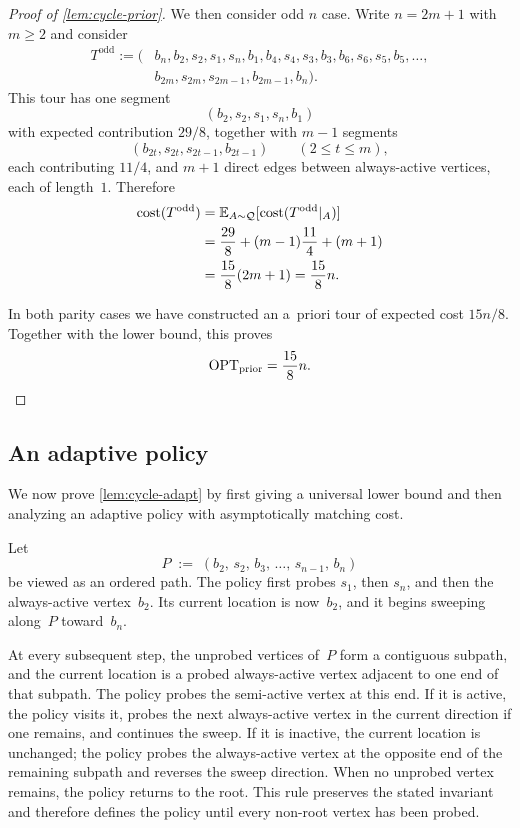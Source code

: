 \documentclass[12pt,a4paper,oneside]{report}
\begin{document}
\begin{proof}[Proof of \cref{lem:cycle-prior}]
\medskip
We then consider odd $n$ case.
Write $n=2m+1$ with $m\ge2$ and consider
\begin{align*}
T^{\mathrm{odd}}
:=(&b_n,b_2,s_2,s_1,s_n,b_1,
   b_4,s_4,s_3,b_3,
   b_6,s_6,s_5,b_5,
   \dots,\\
  &b_{2m},s_{2m},s_{2m-1},b_{2m-1},b_n).
\end{align*}
This tour has one segment
\[
    (b_2,s_2,s_1,s_n,b_1)
\]
with expected contribution $29/8$, together with $m-1$ segments
\[
    (b_{2t},s_{2t},s_{2t-1},b_{2t-1})
    \qquad(2\le t\le m),
\]
each contributing $11/4$, and $m+1$ direct edges between always-active vertices,
each of length~$1$.  Therefore
\begin{align*}
    \operatorname{cost}(T^{\mathrm{odd}})
    &=\mathbb{E}_{A\sim\mathcal Q}[\operatorname{cost}(T^{\mathrm{odd}}|_A)]\\
    &=
    \frac{29}{8}
    +(m-1)\frac{11}{4}
    +(m+1)\\
    &=
    \frac{15}{8}(2m+1)
    =
    \frac{15}{8}n.
\end{align*}

In both parity cases we have constructed an a~priori tour of expected cost
$15n/8$.  Together with the lower bound, this proves
\[
    \operatorname{OPT}_\mathrm{prior}=\frac{15}{8}n. \qedhere 
\]
\end{proof}

\subsection{An adaptive policy}
\label{sec:cycle-adaptive-policy}

We now prove \cref{lem:cycle-adapt} by first giving a universal lower bound and
then analyzing an adaptive policy with asymptotically matching cost.

Let
\[
P \;:=\; (b_2,\,s_2,\,b_3,\,\dots,\,s_{n-1},\,b_n)
\]
be viewed as an ordered path.  The policy first probes $s_1$, then $s_n$, and
then the always-active vertex~$b_2$.  Its current location is now~$b_2$, and it
begins sweeping along~$P$ toward~$b_n$.

At every subsequent step, the unprobed vertices of~$P$ form a contiguous
subpath, and the current location is a probed always-active vertex adjacent to
one end of that subpath.  The policy probes the semi-active vertex at this end.
If it is active, the policy visits it, probes the next always-active vertex in
the current direction if one remains, and continues the sweep.  If it is
inactive, the current location is unchanged; the policy probes the
always-active vertex at the opposite end of the remaining subpath and reverses
the sweep direction.  When no unprobed vertex remains, the policy returns to
the root.  This rule preserves the stated invariant and therefore defines the
policy until every non-root vertex has been probed.
\end{document}
